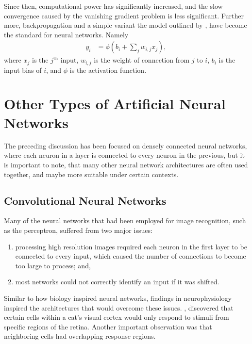 Since then, computational power has significantly increased, and the slow
convergence caused by the vanishing gradient problem is less significant.
Further more, backpropagation and a simple variant the model outlined by
\cite{McClelland:1986:Parallel}, have become the standard for neural networks.
Namely
\begin{align*}
    y_i &= \phi\left(b_i + \sum_j w_{i,j} x_j\right),
\end{align*}
where $x_j$ is the $j^\text{th}$ input, $w_{i,j}$ is the weight of connection
from $j$ to $i$, $b_i$ is the input bias of $i$, and $\phi$ is the activation
function.




\section{Other Types of Artificial Neural Networks}

The preceding discussion has been focused on densely connected neural
networks, where each neuron in a layer is connected to every neuron in the
previous, but it is important to note, that many other neural network
architectures are often used together, and maybe more suitable under certain
contexts.




\subsection{Convolutional Neural Networks}
\label{subsec:history:conv}

Many of the neural networks that had been employed for image recognition, such
as the perceptron, suffered from two major issues:
\begin{enumerate}
    \item processing high resolution images required each neuron in the first
        layer to be connected to every input, which caused the number of
        connections to become too large to process; and,
    \item most networks could not correctly identify an input if it was shifted.
\end{enumerate}
Similar to how biology inspired neural networks, findings in neurophysiology
inspired the architectures that would overcome these issues.
\cite{Hubel:1959:Receptive}, discovered that certain cells within a cat's
visual cortex would only respond to stimuli from specific regions of the retina.
Another important observation was that neighboring cells had overlapping
response regions.

